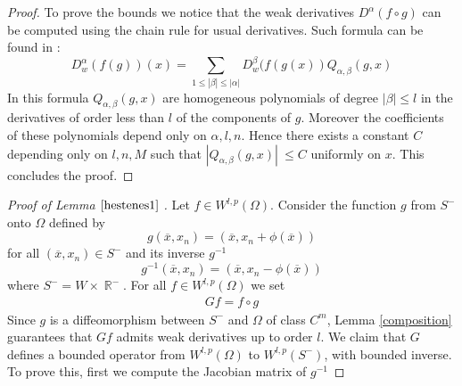 \documentclass[12pt]{article}
\theoremstyle{definition}
\DeclareMathOperator\rr{\mathbb{R}}
\begin{document}
\begin{proof}
To prove the bounds we notice that the weak derivatives $D^\alpha (f \circ g)$ can be computed using the chain rule for usual derivatives. Such formula can be found in \cite[formula B] {fraenkel}:
\[ D^{\alpha}_w(f(g))(x) = \sum_{1\le |\beta|\le|\alpha| }D^{\beta}_w(f(g(x)) Q_{\alpha,\beta}(g,x)\]
In this formula $Q_{\alpha,\beta}(g,x)$ are homogeneous polynomials of degree $|\beta|\le l$ in the derivatives of order less than $l$ of the components of $g$. Moreover the coefficients of these polynomials depend only on $\alpha,l,n$. Hence there exists a constant $C$ depending only on $l,n,M$ such that $|Q_{\alpha,\beta}(g,x)|\ \le C$ uniformly on $x$. This concludes the proof.
\end{proof}

\begin{proof}[Proof of Lemma $\ref{hestenes1}$ ]
Let $f \in W^{l,p}(\Omega).$  Consider the function $g$ from $S^-$ onto $\Omega$ defined by
\[  g(\overline x, x_n)= (\overline x , x_n+ \phi(\overline x))\]
for all $(\overline x, x_n) \in S^-$
and its inverse  $g^{-1}$
\[  g^{-1}(\overline x, x_n)= (\overline x , x_n- \phi(\overline x))\]
where $S^-=W \times \rr^-$. For all $f \in W^{l,p}(\Omega)$ we set
\begin{align*}
 Gf=f \circ g
\end{align*}
Since $g$ is a diffeomorphism between $S^-$ and $\Omega$ of class $C^m$, Lemma \ref{composition} guarantees that $Gf$ admits weak derivatives up to order $l$. We claim that $G$ defines a bounded operator from $W^{l,p}(\Omega)$ to $W^{l,p}(S^-)$, with bounded inverse. To prove this, first we compute the Jacobian matrix of $g^{-1}$


\end{proof}
\end{document}
